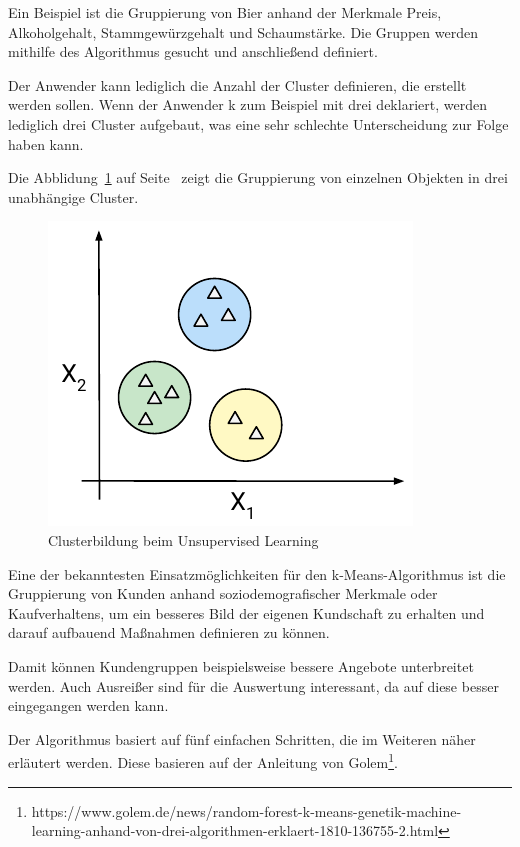 Ein Beispiel ist die Gruppierung von Bier anhand der Merkmale Preis, Alkoholgehalt, Stammgewürzgehalt und Schaumstärke.
Die Gruppen werden mithilfe des Algorithmus gesucht und anschließend definiert.

Der Anwender kann lediglich die Anzahl der Cluster definieren, die erstellt werden sollen. Wenn der Anwender k zum
Beispiel mit drei deklariert, werden lediglich drei Cluster aufgebaut, was eine sehr schlechte Unterscheidung zur Folge
haben kann.

Die Abblidung~\ref{fig:grundlagen_unsupervised_learning} auf Seite~\pageref{fig:grundlagen_unsupervised_learning} zeigt
die Gruppierung von einzelnen Objekten in drei unabhängige Cluster.

\begin{figure}[h]
    \centering
    \includegraphics[scale=1.2]{images/kapitel_2/unsupervised_learning.pdf}
    \caption{Clusterbildung beim Unsupervised Learning}
    \label{fig:grundlagen_unsupervised_learning}
\end{figure}

Eine der bekanntesten Einsatzmöglichkeiten für den k-Means-Algorithmus ist die Gruppierung von Kunden anhand
soziodemografischer Merkmale oder Kaufverhaltens, um ein besseres Bild der eigenen Kundschaft zu erhalten und darauf
aufbauend Maßnahmen definieren zu können.

Damit können Kundengruppen beispielsweise bessere Angebote unterbreitet werden. Auch Ausreißer sind für die Auswertung
interessant, da auf diese besser eingegangen werden kann.

Der Algorithmus basiert auf fünf einfachen Schritten, die im Weiteren näher erläutert werden. Diese basieren auf der
Anleitung von Golem\footnote{https://www.golem.de/news/random-forest-k-means-genetik-machine-learning-anhand-von-drei-algorithmen-erklaert-1810-136755-2.html}.

